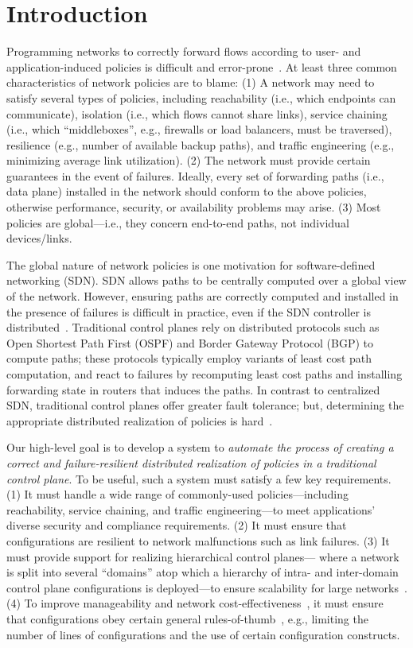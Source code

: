 \section{Introduction}
Programming networks to correctly forward flows according to user- and
application-induced policies is difficult and
error-prone~\cite{troubleshooting, bgpmisconfig}. 
At least three
common characteristics of network policies are to blame: (1) A network
may need to satisfy several types of policies, including reachability
(i.e., which endpoints can communicate), isolation (i.e., which flows
cannot share links), service chaining (i.e., which ``middleboxes'',
e.g., firewalls or load balancers, must be traversed), resilience
(e.g., number of available backup paths), and traffic engineering
(e.g., minimizing average link utilization). (2) The network must
provide certain guarantees in the event of failures. Ideally, every
set of forwarding paths (i.e., data plane) installed in the network
should conform to the above policies, otherwise performance, security, or
availability problems may arise. (3) Most policies are global---i.e.,
they concern end-to-end paths, not individual devices/links.

The global nature of network policies is one motivation for
software-defined networking (SDN). SDN allows paths to be centrally
computed over a global view of the network. However, ensuring paths
are correctly computed and installed in the presence of failures is
difficult in practice, even if the SDN controller is
distributed~\cite{hasdn}.  Traditional control planes rely on
distributed protocols such as Open Shortest Path First (OSPF) and
Border Gateway Protocol (BGP) to compute paths; these protocols
typically employ variants of least cost path computation, and react to
failures by recomputing least cost paths and installing forwarding
state in routers that induces the paths. In contrast to centralized
SDN, traditional control planes offer greater fault tolerance; but,
determining the appropriate distributed realization of policies is
hard~\cite{propane}.

Our high-level goal is to develop a system to {\em automate the
  process of creating a correct and failure-resilient distributed
  realization of policies in a traditional control plane}. To be
useful, such a system must satisfy a few key requirements. (1) It must
handle a wide range of commonly-used policies---including
reachability, service chaining, and traffic engineering---to meet
applications' diverse security and compliance requirements. (2) It
must ensure that configurations are resilient to network malfunctions
such as link failures. (3) It must provide support for realizing
hierarchical control planes--- where a network is split into several
``domains'' atop which a hierarchy of intra- and inter-domain control
plane configurations is deployed---to ensure scalability for large
networks~\cite{routingdesign}. (4) To improve manageability and
network cost-effectiveness~\cite{mpa-imc15,complexity:sigcomm11}, it
must ensure that configurations obey certain general
rules-of-thumb~\cite{complexity:nsdi09}, e.g., limiting the number of
lines of configurations and the use of certain configuration
constructs.

